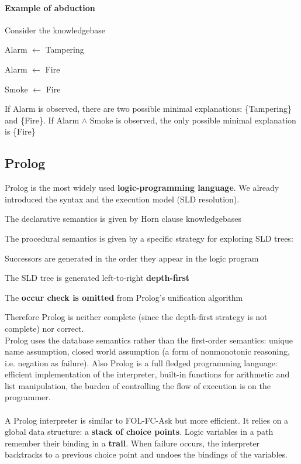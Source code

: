 \documentclass[10pt]{report}
\begin{document}
\paragraph{Example of abduction} Consider the knowledgebase
\begin{list}{}{}
	\item Alarm $\leftarrow$ Tampering
	\item Alarm $\leftarrow$ Fire
	\item Smoke $\leftarrow$ Fire
\end{list}
If Alarm is observed, there are two possible minimal explanations: \{Tampering\} and \{Fire\}. If Alarm $\wedge$ Smoke is observed, the only possible minimal explanation is \{Fire\}
\subsection{Prolog} Prolog is the most widely used \textbf{logic-programming language}. We already introduced the syntax and the execution model (SLD resolution).
\begin{list}{}{}
	\item The declarative semantics is given by Horn clause knowledgebases
	\item The procedural semantics is given by a specific strategy for exploring SLD trees:
	\begin{list}{}{}
		\item Successors are generated in the order they appear in the logic program
		\item The SLD tree is generated left-to-right \textbf{depth-first}
	\end{list}
	\item The \textbf{occur check is omitted} from Prolog's unification algorithm
\end{list}
Therefore Prolog is neither complete (since the depth-first strategy is not complete) nor correct.\\
Prolog uses the database semantics rather than the first-order semantics: unique name assumption, closed world assumption (a form of nonmonotonic reasoning, i.e. negation as failure). Also Prolog is a full fledged programming language: efficient implementation of the interpreter, built-in functions for arithmetic and list manipulation, the burden of controlling the flow of execution is on the programmer.\\\\
A Prolog interpreter is similar to FOL-FC-Ask but more efficient. It relies on a global data structure: a \textbf{stack of choice points}. Logic variables in a path remember their binding in a \textbf{trail}. When failure occurs, the interpreter backtracks to a previous choice point and undoes the bindings of the variables.\\
\end{document}
